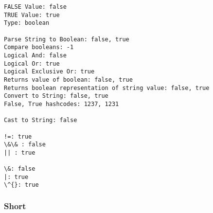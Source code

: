 \documentclass[11pt]{article}
\begin{document}
    \begin{Verbatim}[commandchars=\\\{\}]
FALSE Value: false
TRUE Value: true
Type: boolean

Parse String to Boolean: false, true
Compare booleans: -1
Logical And: false
Logical Or: true
Logical Exclusive Or: true
Returns value of boolean: false, true
Returns boolean representation of string value: false, true
Convert to String: false, true
False, True hashcodes: 1237, 1231

Cast to String: false

!=: true
\&\& : false
|| : true

\&: false
|: true
\^{}: true

    \end{Verbatim}

    \hypertarget{short}{%
\subsubsection{Short}\label{short}}
\end{document}
